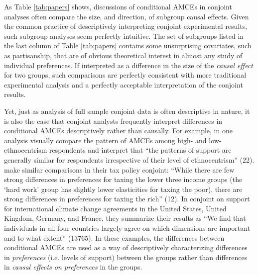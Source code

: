 \documentclass[a4paper,12pt]{article}\usepackage[]{graphicx}\usepackage[]{color}
\begin{document}
As Table \ref{tab:papers} shows, discussions of conditional AMCEs in conjoint analyses often compare the size, and direction, of subgroup causal effects. Given the common practice of descriptively interpreting conjoint experimental results, such subgroup analyses seem perfectly intuitive. The set of subgroups listed in the last column of Table \ref{tab:papers} contains some unsurprising covariates, such as partisanship, that are of obvious theoretical interest in almost any study of individual preferences. If interpreted as a difference in the size of the \textit{causal effect} for two groups, such comparisons are perfectly consistent with more traditional experimental analysis and a perfectly acceptable interpretation of the conjoint results.

Yet, just as analysis of full sample conjoint data is often descriptive in nature, it is also the case that conjoint analysts frequently interpret differences in conditional AMCEs descriptively rather than causally. For example, in one analysis \citet{HainmuellerHopkinsYamamoto2014} visually compare the pattern of AMCEs among high- and low-ethnocentrism respondents and interpret that ``the patterns of support are generally similar for respondents irrespective of their level of ethnocentrism'' (22). \citet{BallardRosaMartinScheve2016} make similar comparisons in their tax policy conjoint: ``While there are few strong differences in preferences for taxing the lower three income groups (the `hard work' group has slightly lower elasticities for taxing the poor), there are strong differences in preferences for taxing the rich'' (12). In \citet{BechtelScheve2013} conjoint on support for international climate change agreements in the United States, United Kingdom, Germany, and France, they summarize their results as ``We find that individuals in all four countries largely agree on which dimensions are important and to what extent'' (13765). In these examples, the differences between conditional AMCEs are used as a way of descriptively characterizing differences in \textit{preferences} (i.e. levels of support) between the groups rather than differences in \textit{causal effects on preferences} in the groups.
\end{document}
